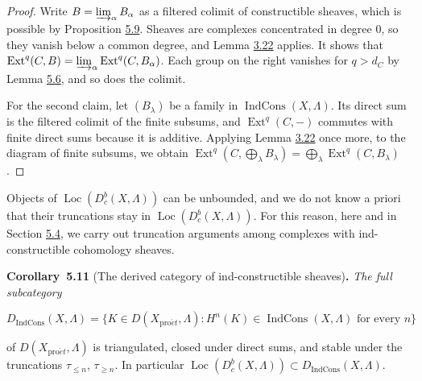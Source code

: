 \documentclass[11pt]{article}
\newenvironment{bpstatement}[2]{\par\addvspace{0.6\baselineskip}\noindent\textbf{#1}#2\textbf{.}\enspace\ignorespaces}
  {\par\addvspace{0.4\baselineskip}}
\newenvironment{bpstatementit}[2]{\begin{bpstatement}{#1}{#2}\itshape\ignorespaces}{\end{bpstatement}}
\providecommand{\Dbc}{}\renewcommand{\Dbc}{D^b_c}
\providecommand{\Dic}{}\renewcommand{\Dic}{D_{\IndCons}}
\providecommand{\Ext}{}\renewcommand{\Ext}{\operatorname{Ext}}
\providecommand{\IndCons}{}\renewcommand{\IndCons}{\operatorname{IndCons}}
\providecommand{\Loc}{}\renewcommand{\Loc}{\operatorname{Loc}}
\begin{document}
\begin{proof}[{Proof}]\label{bp437}%
Write \(B=\varinjlim_\alpha B_\alpha\) as a filtered colimit of constructible sheaves, which is possible by Proposition \hyperref[bp433]{5.9}. Sheaves are complexes concentrated in degree \(0\), so they vanish below a common degree, and Lemma \hyperref[bp260]{3.22} applies. It shows that \(\Ext^q(C,B)=\varinjlim_\alpha\Ext^q(C,B_\alpha)\). Each group on the right vanishes for \(q>d_C\) by Lemma \hyperref[bp426]{5.6}, and so does the colimit.

For the second claim, let \((B_\lambda)\) be a family in \(\IndCons(X,\Lambda)\). Its direct sum is the filtered colimit of the finite subsums, and \(\Ext^q(C,-)\) commutes with finite direct sums because it is additive. Applying Lemma \hyperref[bp260]{3.22} once more, to the diagram of finite subsums, we obtain \(\Ext^q(C,\bigoplus_\lambda B_\lambda)=\bigoplus_\lambda\Ext^q(C,B_\lambda)\).
\end{proof}

\label{bp438}%
Objects of \(\Loc(\Dbc(X,\Lambda))\) can be unbounded, and we do not know a priori that their truncations stay in \(\Loc(\Dbc(X,\Lambda))\). For this reason, here and in Section \hyperref[bp459]{5.4}, we carry out truncation arguments among complexes with ind-constructible cohomology sheaves.

\label{bp439}%
\begin{bpstatementit}{Corollary~5.11}{ (The derived category of ind-constructible sheaves)}
The full subcategory

\[
\Dic(X,\Lambda)
=\{K\in D(X_{\mathrm{pro}\acute{e}t},\Lambda):H^n(K)\in\IndCons(X,\Lambda)\text{ for every }n\}
\]

of \(D(X_{\mathrm{pro}\acute{e}t},\Lambda)\) is triangulated, closed under direct sums, and stable under the truncations \(\tau_{\leq n}\), \(\tau_{\geq n}\). In particular \(\Loc(\Dbc(X,\Lambda))\subset\Dic(X,\Lambda)\).
\end{bpstatementit}
\end{document}
